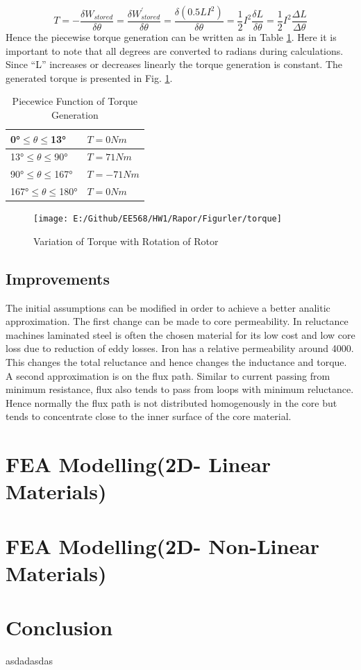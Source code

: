 \documentclass{article}
\begin{document}
\begin{equation}
T=-\frac{\delta W_{stored}}{\delta\theta}=\frac{\delta W^{'}_{stored}}{\delta\theta}=\frac{\delta(0.5LI^2)}{\delta\theta}=\frac{1}{2}I^2\frac{\delta L}{\delta\theta}=\frac{1}{2}I^2\frac{\Delta L}{\Delta\theta}
\label{torqueformula}
\end{equation}
Hence the piecewise torque generation can be written as in Table \ref{torquetable}. Here it is important to note that all degrees are converted to radians during calculations. Since \enquote{L} increases or decreases linearly the torque generation is constant. The generated torque is presented in Fig. \ref{fig:torqueanalitic}.
	\begin{table}[h!]
	\centering
	\caption{Piecewice Function of Torque Generation}
	\label{torquetable}
	\begin{tabular}{ll}		
		\hline
		\ang{0}$\leq$$\theta$$\leq$\ang{13}	& $T=0 Nm$ \\ \hline
		\ang{13}$\leq$$\theta$$\leq$\ang{90}	& $T=71 Nm$ \\ \hline
		\ang{90}$\leq$$\theta$$\leq$\ang{167}	& $T=-71 Nm$ \\ \hline
		\ang{167}$\leq$$\theta$$\leq$\ang{180}	& $T=0 Nm$ \\ \hline
	\end{tabular}	
\end{table}
\begin{figure}[H]
	\centering
	\texttt{[image: E:/Github/EE568/HW1/Rapor/Figurler/torque]}
	\caption{Variation of Torque with Rotation of Rotor}
	\label{fig:torqueanalitic}
\end{figure}

\subsection{Improvements}
The initial assumptions can be modified in order to achieve a better analitic approximation. The first change can be made to core permeability. In reluctance machines laminated steel is often the chosen material for its low cost and low core loss due to reduction of eddy losses. Iron has a relative permeability around 4000. This changes the total reluctance and hence changes the inductance and torque. A second approximation is on the flux path. Similar to current passing from minimum resistance, flux also tends to pass from loops with minimum reluctance. Hence normally the flux path is not distributed homogenously in the core but tends to concentrate close to the inner surface of the core material. 

\section{FEA Modelling(2D- Linear Materials)}
\section{FEA Modelling(2D- Non-Linear Materials)}
\section{Conclusion}

asdadasdas
\end{document}
